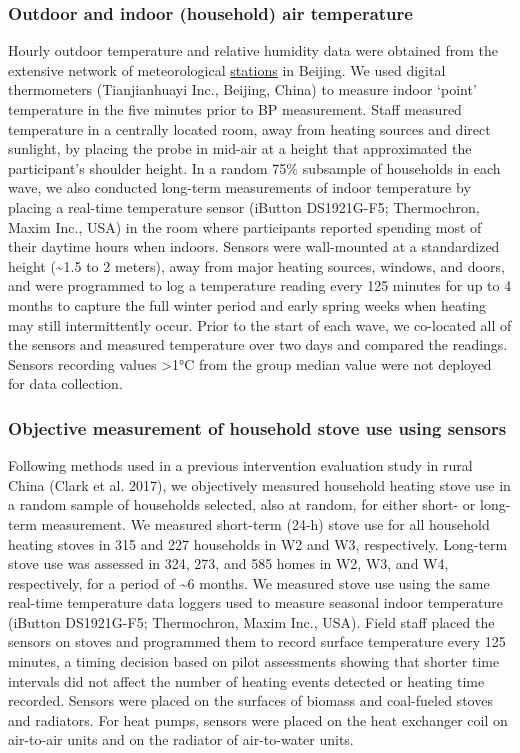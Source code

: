 \documentclass[
  letterpaper,
  DIV=11,
  numbers=noendperiod]{scrartcl}
\begin{document}
\subsubsection{Outdoor and indoor (household) air
temperature}\label{outdoor-and-indoor-household-air-temperature}

Hourly outdoor temperature and relative humidity data were obtained from
the extensive network of meteorological
\href{http://beijingair.sinaapp.com}{stations} in Beijing. We used
digital thermometers (Tianjianhuayi Inc., Beijing, China) to measure
indoor `point' temperature in the five minutes prior to BP measurement.
Staff measured temperature in a centrally located room, away from
heating sources and direct sunlight, by placing the probe in mid-air at
a height that approximated the participant's shoulder height. In a
random 75\% subsample of households in each wave, we also conducted
long-term measurements of indoor temperature by placing a real-time
temperature sensor (iButton DS1921G-F5; Thermochron, Maxim Inc., USA) in
the room where participants reported spending most of their daytime
hours when indoors. Sensors were wall-mounted at a standardized height
(\textasciitilde1.5 to 2 meters), away from major heating sources,
windows, and doors, and were programmed to log a temperature reading
every 125 minutes for up to 4 months to capture the full winter period
and early spring weeks when heating may still intermittently occur.
Prior to the start of each wave, we co-located all of the sensors and
measured temperature over two days and compared the readings. Sensors
recording values \textgreater1°C from the group median value were not
deployed for data collection.

\subsubsection{Objective measurement of household stove use using
sensors}\label{objective-measurement-of-household-stove-use-using-sensors}

Following methods used in a previous intervention evaluation study in
rural China (Clark et al. 2017), we objectively measured household
heating stove use in a random sample of households selected, also at
random, for either short- or long-term measurement. We measured
short-term (24-h) stove use for all household heating stoves in 315 and
227 households in W2 and W3, respectively. Long-term stove use was
assessed in 324, 273, and 585 homes in W2, W3, and W4, respectively, for
a period of \textasciitilde6 months. We measured stove use using the
same real-time temperature data loggers used to measure seasonal indoor
temperature (iButton DS1921G-F5; Thermochron, Maxim Inc., USA). Field
staff placed the sensors on stoves and programmed them to record surface
temperature every 125 minutes, a timing decision based on pilot
assessments showing that shorter time intervals did not affect the
number of heating events detected or heating time recorded. Sensors were
placed on the surfaces of biomass and coal-fueled stoves and radiators.
For heat pumps, sensors were placed on the heat exchanger coil on
air-to-air units and on the radiator of air-to-water units.
\end{document}
